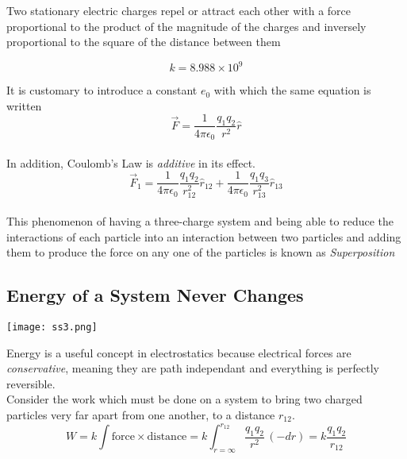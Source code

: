 \documentclass[svgnames]{article}
\begin{document}
Two stationary electric charges repel or attract each other with a force proportional to the product of the magnitude of the charges and inversely proportional to the square of the distance between them

\[ k = 8.988 \times 10^9 \] 
 
It is customary to introduce a constant $e_0$ with which the same equation is written \\ 

\[ \vec{F} = \frac{1}{4\pi \epsilon_0}\frac{q_1q_2}{r^2}\hat{r} \] \\

In addition, Coulomb's Law is \textit{additive} in its effect. \\

\[ \vec{F}_1 = \frac{1}{4\pi \epsilon_0}\frac{q_1q_2}{r_{12}^2}\hat{r}_{12} + \frac{1}{4\pi \epsilon_0}\frac{q_1q_3}{r_{13}^2}\hat{r}_{13} \] \\

This phenomenon of having a three-charge system and being able to reduce the interactions of each particle into an interaction between two particles and adding them to produce the force on any one of the particles is known as \textit{Superposition} 

\subsection{Energy of a System Never Changes}

\vspace{20px}

\begin{center}
\texttt{[image: ss3.png]}
\end{center} 


\vspace{20px}

Energy is a useful concept in electrostatics because electrical forces are \textit{conservative}, meaning they are path independant and everything is perfectly reversible. \\ 

Consider the work which must be done on a system to bring two charged particles very far apart from one another, to a distance $r_{12}$. \\

\[ W = k \int \text{force} \times \text{distance} = k\int_{r = \infty}^{r_{12}} \frac{q_1q_2}{r^2}\,(-dr) = k\frac{q_1q_2}{r_{12}} \] \\
\end{document}
